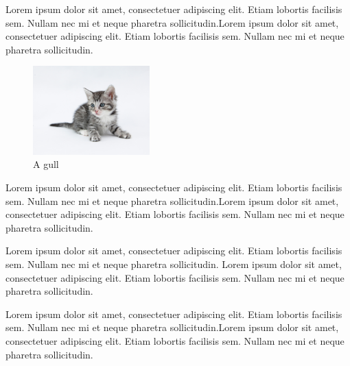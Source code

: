\documentclass[12pt]{article}
\begin{document}
Lorem ipsum dolor sit amet, consectetuer adipiscing elit. Etiam lobortis facilisis sem. Nullam nec mi et neque pharetra sollicitudin.Lorem ipsum dolor sit amet, consectetuer adipiscing elit. Etiam lobortis facilisis sem. Nullam nec mi et neque pharetra sollicitudin.


\begin{figure}
  \vspace{-20pt}
  \begin{center}
    \includegraphics[width=0.4\textwidth]{./kitten2.jpg}
  \end{center}
  \vspace{-20pt}
  \caption{A gull}
  \vspace{-10pt}
\end{figure}



Lorem ipsum dolor sit amet, consectetuer adipiscing elit. 
Etiam lobortis facilisis sem. Nullam nec mi et neque pharetra sollicitudin.Lorem ipsum dolor sit amet, consectetuer adipiscing elit. Etiam lobortis facilisis sem. Nullam nec mi et neque pharetra sollicitudin.

Lorem ipsum dolor sit amet, consectetuer adipiscing elit. Etiam lobortis facilisis sem. Nullam nec mi et neque pharetra sollicitudin. Lorem ipsum dolor sit amet, consectetuer adipiscing elit. Etiam lobortis facilisis sem. Nullam nec mi et neque pharetra sollicitudin.

Lorem ipsum dolor sit amet, consectetuer adipiscing elit. Etiam lobortis facilisis sem. Nullam nec mi et neque pharetra sollicitudin.Lorem ipsum dolor sit amet, consectetuer adipiscing elit. Etiam lobortis facilisis sem. Nullam nec mi et neque pharetra sollicitudin.






\newpage
\end{document}
